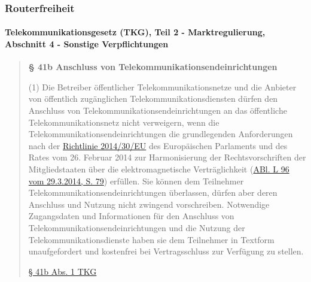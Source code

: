 \documentclass[t]{beamer}
\makeatletter
\newcommand{\strong}[1]{\@strong{#1}}
\newcommand{\@@strong}[1]{\textbf{\let\@strong\@@@strong#1}}
\newcommand{\@@@strong}[1]{\textnormal{\let\@strong\@@strong#1}}
\let\@strong\@@strong
\makeatother
\begin{document}
\begin{frame}
    \frametitle{Routerfreiheit}
    \framesubtitle{Telekommunikationsgesetz (TKG), Teil 2 - Marktregulierung,\\
        Abschnitt 4 - Sonstige Verpflichtungen}

\blockquote[\href{https://dejure.org/gesetze/TKG/41b.html\#Abs1}{§ 41b
Abs. 1 TKG}]{\small%
\strong{§ 41b Anschluss von Telekommunikationsendeinrichtungen}

\footnotesize (1) Die Betreiber öffentlicher Telekommunikationsnetze und
die Anbieter von öffentlich zugänglichen Telekommunikationsdiensten
dürfen den Anschluss von Telekommunikationsendeinrichtungen an das
öffentliche Telekommunikationsnetz nicht verweigern, wenn die
Telekommunikationsendeinrichtungen die grundlegenden Anforderungen nach
der
\href{http://eur-lex.europa.eu/legal-content/DE/TXT/?uri=celex:32014L0030&locale=de}{Richtlinie 2014/30/EU}
des Europäischen Parlaments und des Rates vom 26. Februar 2014 zur
Harmonisierung der Rechtsvorschriften der Mitgliedstaaten über die
elektromagnetische Verträglichkeit
(\href{http://eur-lex.europa.eu/legal-content/DE/AUTO/?uri=uriserv:OJ.L_.2014.096.01.0079.01.DEU&locale=de&toc=OJ:L:2014:096:TOC}{ABl. L 96 vom 29.3.2014, S. 79})
erfüllen. Sie können dem Teilnehmer Telekommunikationsendeinrichtungen
überlassen, dürfen aber deren Anschluss und Nutzung nicht zwingend
vorschreiben. Notwendige Zugangsdaten und Informationen für den
Anschluss von Telekommunikationsendeinrichtungen und die Nutzung der
Telekommunikationsdienste haben sie dem Teilnehmer in Textform
unaufgefordert und kostenfrei bei Vertragsschluss zur Verfügung zu
stellen.}
\end{frame}
\end{document}
